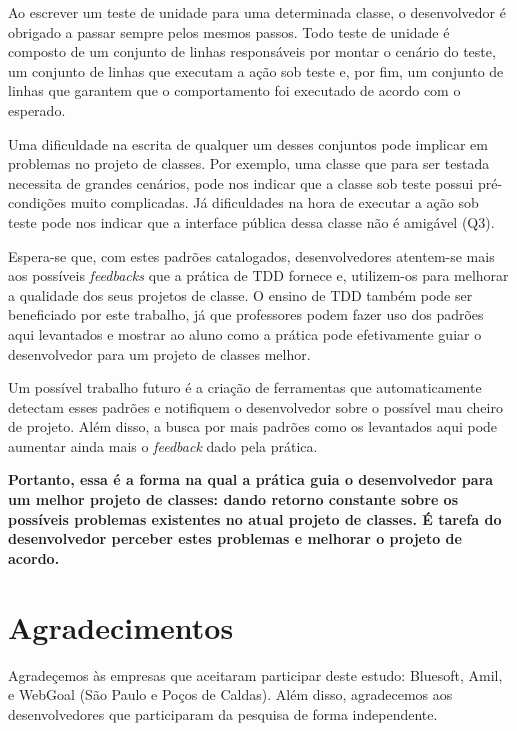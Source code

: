 \documentclass[conference]{IEEEtran}
\begin{document}
Ao escrever um teste de unidade para uma determinada classe, o desenvolvedor
é obrigado a passar sempre pelos mesmos passos. Todo teste de unidade é composto
de um conjunto de linhas responsáveis por montar o cenário do teste, um conjunto
de linhas que executam a ação sob teste e, por fim, um conjunto de linhas que
garantem que o comportamento foi executado de acordo com o esperado.

Uma dificuldade na escrita de qualquer um desses conjuntos pode implicar
em problemas no projeto de classes. Por exemplo, uma classe que para
ser testada necessita de grandes cenários, pode nos indicar que a classe
sob teste possui pré-condições muito complicadas. Já dificuldades na hora
de executar a ação sob teste pode nos indicar que a interface pública dessa
classe não é amigável (Q3). 

Espera-se que, com estes padrões catalogados, desenvolvedores atentem-se mais
aos possíveis \textit{feedbacks} que a prática de TDD fornece e, utilizem-os
para melhorar a qualidade dos seus projetos de classe. O ensino de TDD também
pode ser beneficiado por este trabalho, já que professores podem fazer uso dos padrões
aqui levantados e mostrar ao aluno como a prática pode efetivamente guiar
o desenvolvedor para um projeto de classes melhor.

Um possível trabalho futuro
é a criação de ferramentas que automaticamente detectam esses padrões e notifiquem
o desenvolvedor sobre o possível mau cheiro de projeto. 
Além disso, a busca por mais padrões como os levantados aqui pode aumentar ainda 
mais o \textit{feedback} dado pela prática. 

\textbf{Portanto, essa é a forma na qual a prática guia o desenvolvedor para
um melhor projeto de classes: dando retorno constante sobre os possíveis problemas
existentes no atual projeto de classes. É tarefa do desenvolvedor perceber
estes problemas e melhorar o projeto de acordo.}

\section*{Agradecimentos}

Agradeçemos às empresas que aceitaram participar deste estudo: Bluesoft,
Amil, e WebGoal (São Paulo e Poços de Caldas). Além disso, agradecemos aos
desenvolvedores que participaram da pesquisa de forma independente.


\footnotesize{}

\end{document}
